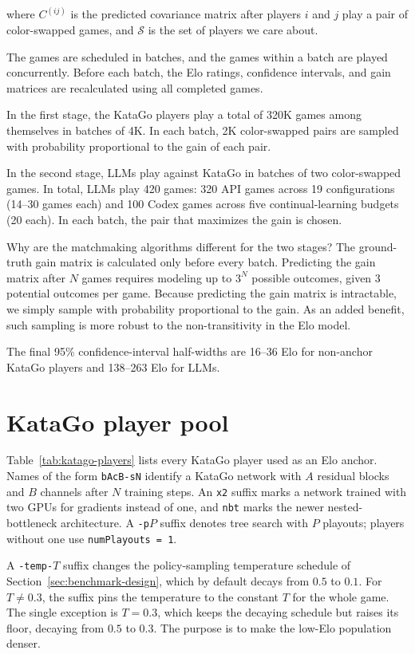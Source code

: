 \documentclass{article}
\begin{document}
where $C^{(ij)}$ is the predicted covariance matrix after players $i$ and $j$ play a pair of color-swapped games, and $\mathcal{S}$ is the set of players we care about.


The games are scheduled in batches, and the games within a batch are played concurrently.
Before each batch, the Elo ratings, confidence intervals, and gain matrices are recalculated using all completed games.

In the first stage, the KataGo players play a total of 320K games among themselves in batches of 4K.
In each batch, 2K color-swapped pairs are sampled with probability proportional to the gain of each pair.

In the second stage, LLMs play against KataGo in batches of two color-swapped
games. In total, LLMs play 420 games: 320 API games across 19
configurations (14--30 games each) and 100 Codex games across five continual-learning
budgets (20 each). In each batch, the pair that maximizes the gain is chosen.

Why are the matchmaking algorithms different for the two stages?
The ground-truth gain matrix is calculated only before every batch.
Predicting the gain matrix after $N$ games requires modeling up to $3^N$ possible outcomes, given 3 potential outcomes per game.
Because predicting the gain matrix is intractable, we simply sample with probability proportional to the gain.
As an added benefit, such sampling is more robust to the non-transitivity in the Elo model.

The final 95\% confidence-interval half-widths are 16--36 Elo for non-anchor KataGo players and 138--263 Elo for LLMs.

\clearpage
\section{KataGo player pool}
\label{app:katago-players}

Table~\ref{tab:katago-players} lists every KataGo player used as an Elo anchor.
Names of the form \texttt{bAcB-sN} identify a KataGo network with $A$ residual
blocks and $B$ channels after $N$ training steps. An \texttt{x2} suffix marks a
network trained with two GPUs for gradients instead of one, and \texttt{nbt} marks the
newer nested-bottleneck architecture. A \texttt{-p$P$} suffix denotes tree
search with $P$ playouts; players without one use \texttt{numPlayouts = 1}.

A \texttt{-temp-$T$} suffix changes the policy-sampling temperature schedule of
Section~\ref{sec:benchmark-design}, which by default decays from $0.5$ to $0.1$.
For $T \neq 0.3$, the suffix pins the temperature to the constant $T$ for the whole
game. The single exception is $T = 0.3$, which keeps the decaying schedule but
raises its floor, decaying from $0.5$ to $0.3$. The purpose is to make the low-Elo population denser.
\end{document}
